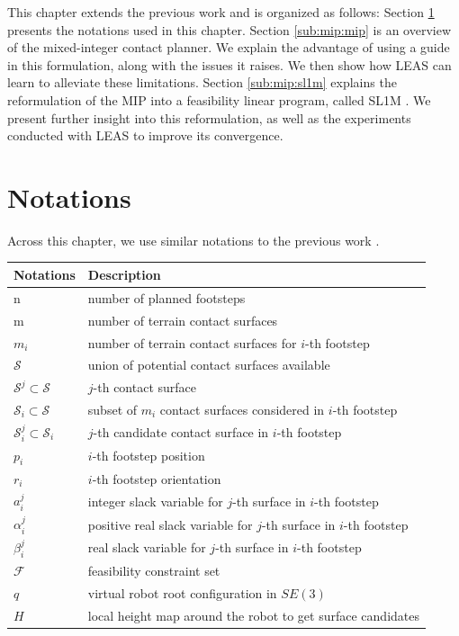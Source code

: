 This chapter extends the previous work \cite{sl1m_v2} and is organized as follows:
Section \ref{sub:mip:notations} presents the notations used in this chapter.
Section \ref{sub:mip:mip} is an overview of the mixed-integer contact planner.
We explain the advantage of using a guide in this formulation, along with the issues it raises. 
We then show how LEAS can learn to alleviate these limitations.
Section \ref{sub:mip:sl1m} explains the reformulation of the MIP into a feasibility linear program, called SL1M \cite{sl1m_v1}. 
We present further insight into this reformulation, as well as the experiments conducted with LEAS to improve its convergence.

\section{Notations}
\label{sub:mip:notations}
Across this chapter, we use similar notations to the previous work \cite{sl1m_v2}.
\begin{center}
\begin{tabular}{ l l } 
    \hline
    \textbf{Notations} & \textbf{Description} \\ 
    \hline
    n                  & number of planned footsteps \\ 
    m                  & number of terrain contact surfaces \\ 
    $m_i$                & number of terrain contact surfaces for $i$-th footstep \\
    $\mathcal{S}$      & union of potential contact surfaces available \\
    $\mathcal{S}^j \subset \mathcal{S}$     & $j$-th contact surface \\
    $\mathcal{S}_i \subset \mathcal{S}$     & subset of $m_i$ contact surfaces considered in $i$-th footstep \\ 
    $\mathcal{S}_i^j \subset \mathcal{S}_i$ & $j$-th candidate contact surface in $i$-th footstep \\ 
    $p_i$              & $i$-th footstep position\\ 
    $r_i$              & $i$-th footstep orientation\\
    $a_i^j$            & integer slack variable for $j$-th surface in $i$-th footstep \\ 
    $\alpha_i^j$       & positive real slack variable for $j$-th surface in $i$-th footstep \\ 
    $\beta_i^j$        & real slack variable for $j$-th surface in $i$-th footstep \\
    $\mathcal{F}$      & feasibility constraint set \\
    $q$              & virtual robot root configuration in $SE(3)$\\
    $H$              & local height map around the robot to get surface candidates\\
    \hline
\end{tabular}
\end{center}

